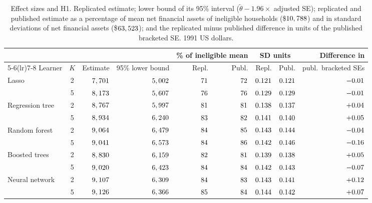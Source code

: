 \documentclass[11pt]{article}
\begin{document}
\begin{table}[t]
\centering
\caption{Effect sizes and H1. Replicated estimate; lower bound of its 95\% interval
($\tilde\theta - 1.96 \times$ adjusted SE); replicated and published estimate as a
percentage of mean net financial assets of ineligible households (\$$10,788$)
and in standard deviations of net financial assets (\$$63,523$); and the replicated
minus published difference in units of the published bracketed SE. 1991 US dollars.}
\label{tab:effect}
{\footnotesize
\begin{tabular}{@{}l c r r rr rr r@{}}
\toprule
 & & & & \multicolumn{2}{c}{\% of ineligible mean} & \multicolumn{2}{c}{SD units} & Difference in \\
\cmidrule(lr){5-6}\cmidrule(lr){7-8}
Learner & $K$ & Estimate & 95\% lower bound & Repl. & Publ. & Repl. & Publ. & publ.\ bracketed SEs \\
\midrule
Lasso & 2 & $7,701$ & $5,002$ & $71$ & $72$ & $0.121$ & $0.121$ & $-0.01$ \\
 & 5 & $8,173$ & $5,607$ & $76$ & $76$ & $0.129$ & $0.129$ & $-0.01$ \\
\addlinespace
Regression tree & 2 & $8,767$ & $5,997$ & $81$ & $81$ & $0.138$ & $0.137$ & $+0.04$ \\
 & 5 & $8,934$ & $6,240$ & $83$ & $82$ & $0.141$ & $0.140$ & $+0.05$ \\
\addlinespace
Random forest & 2 & $9,064$ & $6,479$ & $84$ & $85$ & $0.143$ & $0.144$ & $-0.04$ \\
 & 5 & $9,041$ & $6,573$ & $84$ & $86$ & $0.142$ & $0.146$ & $-0.16$ \\
\addlinespace
Boosted trees & 2 & $8,830$ & $6,159$ & $82$ & $81$ & $0.139$ & $0.138$ & $+0.05$ \\
 & 5 & $9,020$ & $6,423$ & $84$ & $84$ & $0.142$ & $0.143$ & $-0.07$ \\
\addlinespace
Neural network & 2 & $9,107$ & $6,309$ & $84$ & $83$ & $0.143$ & $0.141$ & $+0.12$ \\
 & 5 & $9,126$ & $6,366$ & $85$ & $84$ & $0.144$ & $0.142$ & $+0.07$ \\
\bottomrule
\end{tabular}}
\end{table}
\end{document}

